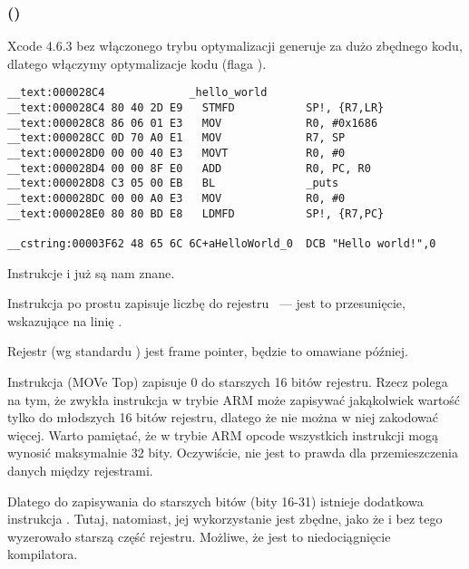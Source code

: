 \subsubsection{\OptimizingXcodeIV (\ARMMode)}

Xcode 4.6.3 bez włączonego trybu optymalizacji generuje za dużo zbędnego kodu, dlatego włączymy optymalizacje kodu (flaga \Othree).

\begin{lstlisting}[caption=\OptimizingXcodeIV (\ARMMode),style=customasmARM]
__text:000028C4             _hello_world
__text:000028C4 80 40 2D E9   STMFD           SP!, {R7,LR}
__text:000028C8 86 06 01 E3   MOV             R0, #0x1686
__text:000028CC 0D 70 A0 E1   MOV             R7, SP
__text:000028D0 00 00 40 E3   MOVT            R0, #0
__text:000028D4 00 00 8F E0   ADD             R0, PC, R0
__text:000028D8 C3 05 00 EB   BL              _puts
__text:000028DC 00 00 A0 E3   MOV             R0, #0
__text:000028E0 80 80 BD E8   LDMFD           SP!, {R7,PC}

__cstring:00003F62 48 65 6C 6C+aHelloWorld_0  DCB "Hello world!",0
\end{lstlisting}

Instrukcje  i  już są nam znane.

Instrukcja \MOV po prostu zapisuje liczbę  do rejestru ~--- jest to przesunięcie, wskazujące na linię .

Rejestr  (wg standardu \IOSABI) jest frame pointer, będzie to omawiane później.

Instrukcja  (MOVe Top) zapisuje 0 do starszych 16 bitów rejestru.
Rzecz polega na tym, że zwykła instrukcja \MOV w trybie ARM może zapisywać jakąkolwiek wartość tylko do młodszych 16 bitów rejestru, dlatego że nie można w niej zakodować więcej.
Warto pamiętać, że w trybie ARM opcode wszystkich instrukcji mogą wynosić maksymalnie 32 bity. Oczywiście, nie jest to prawda dla przemieszczenia danych między rejestrami.

Dlatego do zapisywania do starszych bitów (bity 16-31) istnieje dodatkowa instrukcja .
Tutaj, natomiast, jej wykorzystanie jest zbędne, jako że  i bez tego wyzerowało starszą część rejestru.
Możliwe, że jest to niedociągnięcie kompilatora.


